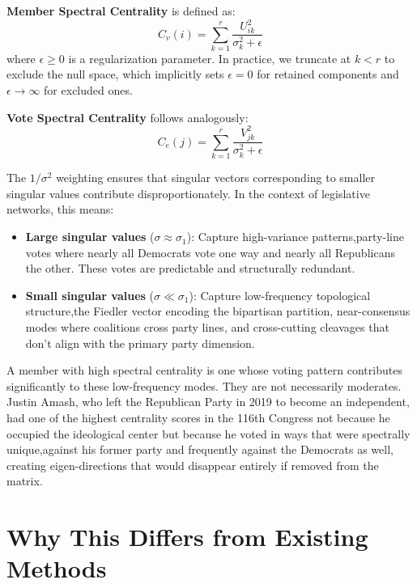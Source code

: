 \documentclass[11pt,a4paper]{article}
\begin{document}
\textbf{Member Spectral Centrality} is defined as:
\begin{equation}
C_v(i) = \sum_{k=1}^{r} \frac{U_{ik}^2}{\sigma_k^2 + \epsilon}
\end{equation}
where $\epsilon \geq 0$ is a regularization parameter. In practice, we truncate at $k < r$ to exclude the null space, which implicitly sets $\epsilon = 0$ for retained components and $\epsilon \to \infty$ for excluded ones.

\textbf{Vote Spectral Centrality} follows analogously:
\begin{equation}
C_e(j) = \sum_{k=1}^{r} \frac{V_{jk}^2}{\sigma_k^2 + \epsilon}
\end{equation}

The $1/\sigma^2$ weighting ensures that singular vectors corresponding to smaller singular values contribute disproportionately. In the context of legislative networks, this means:

\begin{itemize}
    \item \textbf{Large singular values} ($\sigma \approx \sigma_1$): Capture high-variance patterns,party-line votes where nearly all Democrats vote one way and nearly all Republicans the other. These votes are predictable and structurally redundant.
    \item \textbf{Small singular values} ($\sigma \ll \sigma_1$): Capture low-frequency topological structure,the Fiedler vector encoding the bipartisan partition, near-consensus modes where coalitions cross party lines, and cross-cutting cleavages that don't align with the primary party dimension.
\end{itemize}

A member with high spectral centrality is one whose voting pattern contributes significantly to these low-frequency modes. They are not necessarily moderates. Justin Amash, who left the Republican Party in 2019 to become an independent, had one of the highest centrality scores in the 116th Congress not because he occupied the ideological center but because he voted in ways that were spectrally unique,against his former party and frequently against the Democrats as well, creating eigen-directions that would disappear entirely if removed from the matrix.

\section{Why This Differs from Existing Methods}
\end{document}
